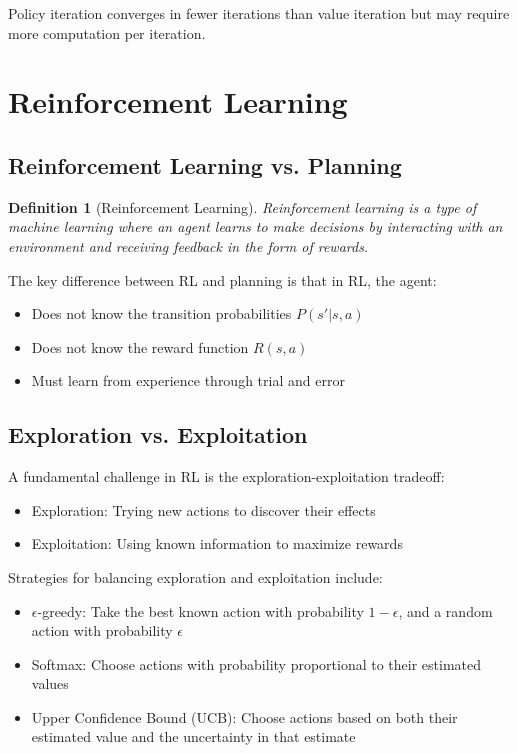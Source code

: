 \documentclass{article}
\newtheorem{definition}{Definition}
\begin{document}
Policy iteration converges in fewer iterations than value iteration but may require more computation per iteration.

\section{Reinforcement Learning}

\subsection{Reinforcement Learning vs. Planning}
\begin{definition}[Reinforcement Learning]
Reinforcement learning is a type of machine learning where an agent learns to make decisions by interacting with an environment and receiving feedback in the form of rewards.
\end{definition}

The key difference between RL and planning is that in RL, the agent:
\begin{itemize}
\item Does not know the transition probabilities $P(s'|s, a)$
\item Does not know the reward function $R(s, a)$
\item Must learn from experience through trial and error
\end{itemize}

\subsection{Exploration vs. Exploitation}
A fundamental challenge in RL is the exploration-exploitation tradeoff:
\begin{itemize}
\item Exploration: Trying new actions to discover their effects
\item Exploitation: Using known information to maximize rewards
\end{itemize}

Strategies for balancing exploration and exploitation include:
\begin{itemize}
\item $\epsilon$-greedy: Take the best known action with probability $1-\epsilon$, and a random action with probability $\epsilon$
\item Softmax: Choose actions with probability proportional to their estimated values
\item Upper Confidence Bound (UCB): Choose actions based on both their estimated value and the uncertainty in that estimate
\end{itemize}
\end{document}
